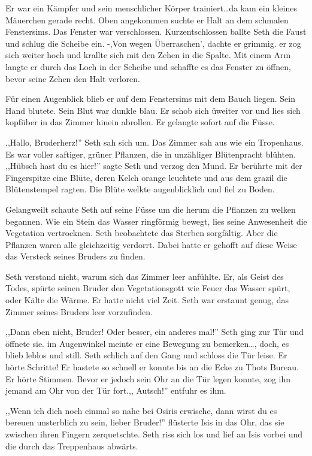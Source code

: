 \documentclass[11pt,titlepage,a5paper]{book}
\begin{document}
Er war ein Kämpfer und sein menschlicher Körper trainiert\dots da kam ein kleines Mäuerchen gerade recht. Oben angekommen suchte er Halt an dem schmalen Fenstersims. Das Fenster war verschlossen. Kurzentschlossen ballte Seth die Faust und schlug die Scheibe ein. -,Von wegen Überraschen', dachte er grimmig. er zog sich weiter hoch und krallte sich mit den Zehen in die Spalte. Mit einem Arm langte er durch das Loch in der Scheibe und schaffte es das Fenster zu öffnen, bevor seine Zehen den Halt verloren.

Für einen Augenblick blieb er auf dem Fenstersims mit dem Bauch liegen. Sein Hand blutete. Sein Blut war dunkle blau. Er schob sich üweiter vor und lies sich kopfüber in das Zimmer hinein abrollen. Er gelangte sofort auf die Füsse.

,,Hallo, Bruderherz!'' Seth sah sich um. Das Zimmer sah aus wie ein Tropenhaus. Es war voller saftiger, grüner Pflanzen, die in unzähliger Blütenpracht blühten. ,,Hübsch hast du es hier!'' sagte Seth und verzog den Mund. Er berührte mit der Fingerspitze eine Blüte, deren Kelch orange leuchtete und aus dem grazil die Blütenstempel ragten. Die Blüte welkte augenblicklich und fiel zu Boden.

Gelangweilt schaute Seth auf seine Füsse um die herum die Pflanzen zu welken begannen. Wie ein Stein das Wasser ringförmig bewegt, lies seine Anwesenheit die Vegetation vertrocknen. Seth beobachtete das Sterben sorgfältig. Aber die Pflanzen waren alle gleichzeitig verdorrt. Dabei hatte er gehofft auf diese Weise das Versteck seines Bruders zu finden. 

Seth verstand nicht, warum sich das Zimmer leer anfühlte. Er, als Geist des Todes, spürte seinen Bruder den Vegetationsgott wie Feuer das Wasser spürt, oder Kälte die Wärme. Er hatte nicht viel Zeit. Seth war erstaunt genug, das Zimmer seines Bruders leer vorzufinden. 

,,Dann eben nicht, Bruder! Oder besser, ein anderes mal!'' Seth ging zur Tür und öffnete sie. im Augenwinkel meinte er eine Bewegung zu bemerken\dots , doch, es blieb leblos und still. Seth schlich auf den Gang und schloss die Tür leise. Er hörte Schritte! Er hastete so schnell er konnte bis  an die Ecke zu Thots Bureau. Er hörte Stimmen. Bevor er jedoch sein Ohr an die Tür legen konnte, zog ihn jemand am Ohr von der Tür fort.,, Autsch!'' entfuhr es ihm.

,,Wenn ich dich noch einmal so nahe bei Osiris erwische, dann wirst du es bereuen unsterblich zu sein, lieber Bruder!'' flüsterte Isis in das Ohr, das sie zwischen ihren Fingern zerquetschte. Seth riss sich los und lief an Isis vorbei und die durch das Treppenhaus abwärts.
\end{document}
